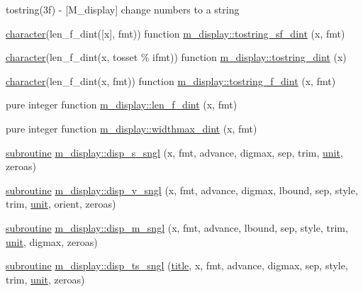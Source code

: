 \begin{DoxyCompactItemize}
\begin{DoxyCompactList}
tostring(3f) -\/ \mbox{[}M\+\_\+display\mbox{]} change numbers to a string \end{DoxyCompactList}\item 
\hyperlink{option__stopwatch_83_8txt_abd4b21fbbd175834027b5224bfe97e66}{character}(len\+\_\+f\+\_\+dint(\mbox{[}x\mbox{]}, fmt)) function \hyperlink{namespacem__display_aa7d1fb61fc22bddb9232eaa13aaaa43f}{m\+\_\+display\+::tostring\+\_\+sf\+\_\+dint} (x, fmt)
\item 
\hyperlink{option__stopwatch_83_8txt_abd4b21fbbd175834027b5224bfe97e66}{character}(len\+\_\+f\+\_\+dint(x, tosset \% ifmt)) function \hyperlink{namespacem__display_a5a8479cdf49ed905e9c54cc2f86cea16}{m\+\_\+display\+::tostring\+\_\+dint} (x)
\item 
\hyperlink{option__stopwatch_83_8txt_abd4b21fbbd175834027b5224bfe97e66}{character}(len\+\_\+f\+\_\+dint(x, fmt)) function \hyperlink{namespacem__display_ac1dd519655fda1c495ba40efe16fbc0b}{m\+\_\+display\+::tostring\+\_\+f\+\_\+dint} (x, fmt)
\item 
pure integer function \hyperlink{namespacem__display_a6a2709cf5f243ee492f223b40c6b5143}{m\+\_\+display\+::len\+\_\+f\+\_\+dint} (x, fmt)
\item 
pure integer function \hyperlink{namespacem__display_a8310ed88204e0715b21b2afb0a6d12ac}{m\+\_\+display\+::widthmax\+\_\+dint} (x, fmt)
\item 
\hyperlink{M__stopwatch_83_8txt_acfbcff50169d691ff02d4a123ed70482}{subroutine} \hyperlink{namespacem__display_a7a66451f6a0931ee7552ee4d8918ac20}{m\+\_\+display\+::disp\+\_\+s\+\_\+sngl} (x, fmt, advance, digmax, sep, trim, \hyperlink{M__stopwatch_83_8txt_a5cbef30eb7c0d734bd82f5a7ebea9aa7}{unit}, zeroas)
\item 
\hyperlink{M__stopwatch_83_8txt_acfbcff50169d691ff02d4a123ed70482}{subroutine} \hyperlink{namespacem__display_a4ef66ee3da74984dd06012837795c459}{m\+\_\+display\+::disp\+\_\+v\+\_\+sngl} (x, fmt, advance, digmax, lbound, sep, style, trim, \hyperlink{M__stopwatch_83_8txt_a5cbef30eb7c0d734bd82f5a7ebea9aa7}{unit}, orient, zeroas)
\item 
\hyperlink{M__stopwatch_83_8txt_acfbcff50169d691ff02d4a123ed70482}{subroutine} \hyperlink{namespacem__display_a4930462636c070e8b4761167fadfd4f9}{m\+\_\+display\+::disp\+\_\+m\+\_\+sngl} (x, fmt, advance, lbound, sep, style, trim, \hyperlink{M__stopwatch_83_8txt_a5cbef30eb7c0d734bd82f5a7ebea9aa7}{unit}, digmax, zeroas)
\item 
\hyperlink{M__stopwatch_83_8txt_acfbcff50169d691ff02d4a123ed70482}{subroutine} \hyperlink{namespacem__display_a7ecc86ce58006c0d4d08efcfdaaf479a}{m\+\_\+display\+::disp\+\_\+ts\+\_\+sngl} (\hyperlink{print__watch_83_8txt_a15b5bd21156bb9fca6a755ab8c029a9c}{title}, x, fmt, advance, digmax, sep, style, trim, \hyperlink{M__stopwatch_83_8txt_a5cbef30eb7c0d734bd82f5a7ebea9aa7}{unit}, zeroas)

\end{DoxyCompactItemize}
